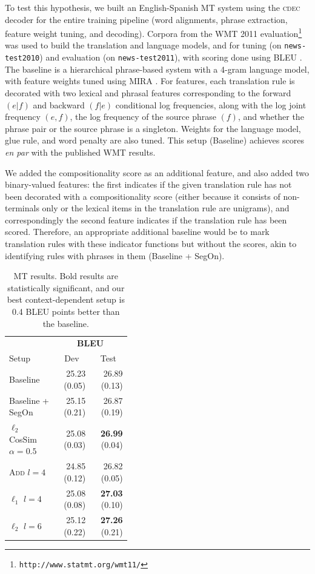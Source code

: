 \documentclass[11pt]{article}
\begin{document}
To test this hypothesis, we built an English-Spanish MT system using the \textsc{cdec} decoder \cite{Dyer2010} for the entire training pipeline (word alignments, phrase extraction, feature weight tuning, and decoding).
Corpora from the WMT 2011 evaluation\footnote{\texttt{http://www.statmt.org/wmt11/}} was used to build the translation and language models, and for tuning (on \texttt{news-test2010}) and evaluation (on \texttt{news-test2011}), with scoring done using BLEU \cite{Papineni2002}. 
The baseline is a hierarchical phrase-based system \cite{Chiang2007} with a 4-gram language model, with feature weights tuned using MIRA \cite{Chiang2012}. 
For features, each translation rule is decorated with two lexical and phrasal features corresponding to the forward $(e|f)$ and backward $(f|e)$ conditional log frequencies, along with the log joint frequency $(e,f)$, the log frequency of the source phrase $(f)$, and whether the phrase pair or the source phrase is a singleton. 
Weights for the language model, glue rule, and word penalty are also tuned. 
This setup (Baseline) achieves scores \emph{en par} with the published WMT results. 

We added the compositionality score as an additional feature, and also added two binary-valued features: the first indicates if the given translation rule has not been decorated with a compositionality score (either because it consists of non-terminals only or the lexical items in the translation rule are unigrams), and correspondingly the second feature indicates if the translation rule has been scored. 
Therefore, an appropriate additional baseline would be to mark translation rules with these indicator functions but without the scores, akin to identifying rules with phrases in them (Baseline + SegOn). 

\begin{table}[h!]
  \begin{center}
    \begin{tabular}{p{0.4\linewidth}rr}
      \hline
	  & \multicolumn{2}{c}{\bf BLEU} \\
      Setup &  \multicolumn{1}{c}{Dev} & \multicolumn{1}{c}{Test} \\
	  \hline
	  Baseline & 25.23 (0.05) & 26.89 (0.13) \\
      Baseline + SegOn & 25.15 (0.21) & 26.87 (0.19) \\
	  $\ell_2$ CosSim $\alpha=0.5$ &  25.08 (0.03) & {\bf26.99} (0.04) \\
  	  \textsc{Add} $l=4$ &  24.85 (0.12) & 26.82 (0.05) \\
      $\ell_1$ $l=4$ &  25.08 (0.08) & {\bf 27.03} (0.10) \\
	  $\ell_2$  $l=6$ & 25.12 (0.22) & {\bf 27.26} (0.21) \\
	\end{tabular}
  \end{center}
  \caption{MT results. Bold results are statistically significant, and our best context-dependent setup is 0.4 BLEU points better than the baseline.}
  \label{tab:mt-results}
\end{table}
\end{document}
